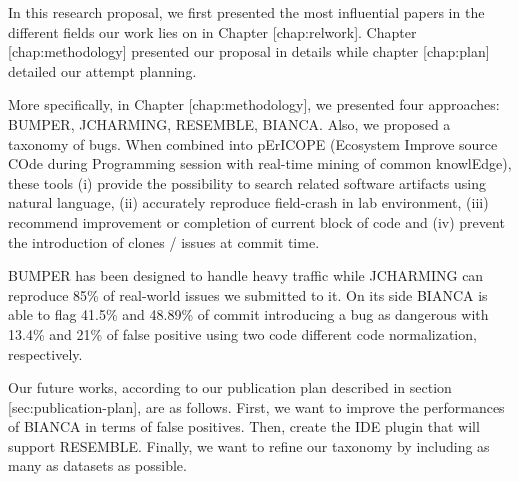 In this research proposal, we first presented the most influential
papers in the different fields our work lies on in Chapter
{[}chap:relwork{]}. Chapter {[}chap:methodology{]} presented our
proposal in details while chapter {[}chap:plan{]} detailed our attempt
planning.

More specifically, in Chapter {[}chap:methodology{]}, we presented four
approaches: {BUMPER}, {JCHARMING}, {RESEMBLE}, {BIANCA}. Also, we
proposed a taxonomy of bugs. When combined into {pErICOPE} (Ecosystem
Improve source COde during Programming session with real-time mining of
common knowlEdge), these tools (i) provide the possibility to search
related software artifacts using natural language, (ii) accurately
reproduce field-crash in lab environment, (iii) recommend improvement or
completion of current block of code and (iv) prevent the introduction of
clones / issues at commit time.

{BUMPER} has been designed to handle heavy traffic while {JCHARMING} can
reproduce 85\% of real-world issues we submitted to it. On its side
{BIANCA} is able to flag 41.5\% and 48.89\% of commit introducing a bug
as dangerous with 13.4\% and 21\% of false positive using two code
different code normalization, respectively.

Our future works, according to our publication plan described in section
{[}sec:publication-plan{]}, are as follows. First, we want to improve
the performances of {BIANCA} in terms of false positives. Then, create
the IDE plugin that will support {RESEMBLE}. Finally, we want to refine
our taxonomy by including as many as datasets as possible.
